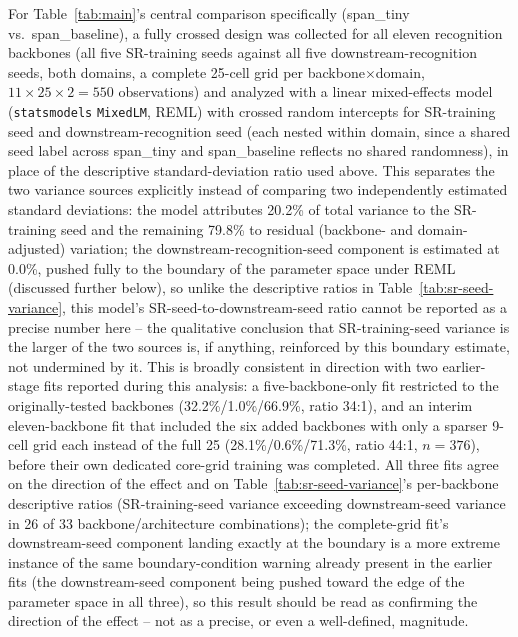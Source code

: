 \documentclass[11pt]{article}
\begin{document}
For Table~\ref{tab:main}'s central comparison specifically (span\_tiny vs.\ span\_baseline), a fully crossed design was collected for all eleven recognition backbones (all five SR-training seeds against all five downstream-recognition seeds, both domains, a complete 25-cell grid per backbone$\times$domain, $11\times25\times2=550$ observations) and analyzed with a linear mixed-effects model (\texttt{statsmodels} \texttt{MixedLM}, REML) with crossed random intercepts for SR-training seed and downstream-recognition seed (each nested within domain, since a shared seed label across span\_tiny and span\_baseline reflects no shared randomness), in place of the descriptive standard-deviation ratio used above. This separates the two variance sources explicitly instead of comparing two independently estimated standard deviations: the model attributes 20.2\% of total variance to the SR-training seed and the remaining 79.8\% to residual (backbone- and domain-adjusted) variation; the downstream-recognition-seed component is estimated at 0.0\%, pushed fully to the boundary of the parameter space under REML (discussed further below), so unlike the descriptive ratios in Table~\ref{tab:sr-seed-variance}, this model's SR-seed-to-downstream-seed ratio cannot be reported as a precise number here -- the qualitative conclusion that SR-training-seed variance is the larger of the two sources is, if anything, reinforced by this boundary estimate, not undermined by it. This is broadly consistent in direction with two earlier-stage fits reported during this analysis: a five-backbone-only fit restricted to the originally-tested backbones (32.2\%/1.0\%/66.9\%, ratio 34:1), and an interim eleven-backbone fit that included the six added backbones with only a sparser 9-cell grid each instead of the full 25 (28.1\%/0.6\%/71.3\%, ratio 44:1, $n=376$), before their own dedicated core-grid training was completed. All three fits agree on the direction of the effect and on Table~\ref{tab:sr-seed-variance}'s per-backbone descriptive ratios (SR-training-seed variance exceeding downstream-seed variance in 26 of 33 backbone/architecture combinations); the complete-grid fit's downstream-seed component landing exactly at the boundary is a more extreme instance of the same boundary-condition warning already present in the earlier fits (the downstream-seed component being pushed toward the edge of the parameter space in all three), so this result should be read as confirming the direction of the effect -- not as a precise, or even a well-defined, magnitude.
\end{document}
